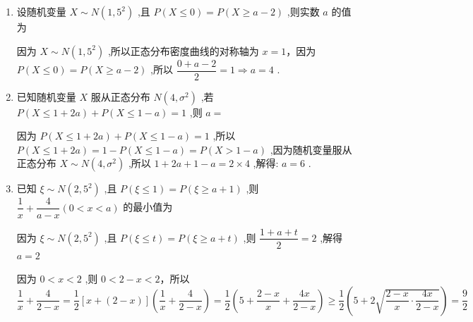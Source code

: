 \begin{enumerate}
\begin{enumerate}
\begin{jieda}
            
            可知 $a,a + 2$ 关于 $x = 1$ 对称,所以 $a + a + 2 = 2 \times  1$ ,解得 $a = 0$
        \end{jieda}
        
        \item 设随机变量 $X \sim  N\left( {1,{5}^{2}}\right)$ ,且 $P\left( {X \leq  0}\right)  = P\left( {X \geq  a - 2}\right)$ ,则实数 $a$ 的值为
        \begin{jieda}
            因为 $X \sim  N\left( {1,{5}^{2}}\right)$ ,所以正态分布密度曲线的对称轴为 $x = 1$，因为 $P\left( {X \leq  0}\right)  = P\left( {X \geq  a - 2}\right)$ ,所以 $\dfrac{0 + a - 2}{2} = 1 \Longrightarrow  a = 4$ .
        \end{jieda}
        
        \item 已知随机变量 $X$ 服从正态分布 $N\left( {4,{\sigma }^{2}}\right)$ ,若 $P(X \leq  1 +  {2a}) + P\left( {X \leq  1 - a}\right)  = 1$ ,则 $a =$
        \begin{jieda}
            因为 $P\left( {X \leq  1 + {2a}}\right)  + P\left( {X \leq  1 - a}\right)  = 1$ ,所以$P\left( {X \leq  1 + {2a}}\right)  = 1 - P\left( {X \leq  1 - a}\right)  = P\left( {X > 1 - a}\right)$ ,因为随机变量服从正态分布 $X \sim  N\left( {4,{\sigma }^{2}}\right)$ ,所以 $1 + {2a} + 1 - a = 2 \times  4$ ,解得: $a = 6$ .
        \end{jieda}
        \item 已知 $\xi  \sim  N\left( {2,{5}^{2}}\right)$ ,且 $P\left( {\xi  \leq  1}\right)  = P\left( {\xi  \geq  a + 1}\right)$ ,则 $\dfrac{1}{x} + \dfrac{4}{a - x}(0 <  x < a)$ 的最小值为
        \begin{jieda}
            因为 $\xi  \sim  N\left( {2,{5}^{2}}\right)$ ,且 $P\left( {\xi  \leq  t}\right)  = P\left( {\xi  \geq  a + t}\right)$ ,则 $\dfrac{1 + a + t}{2} = 2$ ,解得 $a = 2$
            
            因为 $0 < x < 2$ ,则 $0 < 2 - x < 2$，所以 $\dfrac{1}{x} + \dfrac{4}{2 - x} = \dfrac{1}{2}\left\lbrack  {x + \left( {2 - x}\right) }\right\rbrack  \left( {\dfrac{1}{x} + \dfrac{4}{2 - x}}\right)  = \dfrac{1}{2}\left( {5 + \dfrac{2 - x}{x} + \dfrac{4x}{2 - x}}\right) \geq  \dfrac{1}{2}\left( {5 + 2\sqrt{\dfrac{2 - x}{x} \cdot  \dfrac{4x}{2 - x}}}\right)  = \dfrac{9}{2}$
            

\end{jieda}
\end{enumerate}
\end{enumerate}
